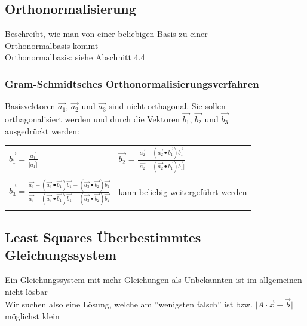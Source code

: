 		 
			
			\subsection{Orthonormalisierung}
			Beschreibt, wie man von einer beliebigen Basis zu einer \\			
			Orthonormalbasis kommt \\		
			Orthonormalbasis: siehe Abschnitt 4.4 \\
			
			
			\subsubsection{Gram-Schmidtsches Orthonormalisierungsverfahren}
			Basisvektoren $\vec{a_1}$, $\vec{a_2}$ und $\vec{a_3}$ sind nicht orthagonal. Sie sollen \\
			orthagonalisiert werden und durch die Vektoren $\vec{b_1}$, $\vec{b_2}$ und $\vec{b_3}$ \\
			ausgedrückt werden: \\
			
			\begin{tabular}{ll}
			$\vec{b_1}$ = $\frac{\vec{a_1}}{\vert \vec{a_1} \vert}$ & $\vec{b_2}$  = $\frac{\vec{a_2} - ( \vec{a_2} \bullet \vec{b_1} ) \vec{b_1}}{\vert \vec{a_2} - ( \vec{a_2} \bullet \vec{b_1} ) \vec{b_1} \vert}$\\
		 \\
			$\vec{b_3}$ = $\frac{\vec{a_3} - ( \vec{a_3} \bullet \vec{b_1} ) \vec{b_1} - ( \vec{a_3} \bullet \vec{b_2} ) \vec{b_2}}  {\vec{a_3} - ( \vec{a_3} \bullet \vec{b_1} ) \vec{b_1} - ( \vec{a_3} \bullet \vec{b_2} ) \vec{b_2}}$  &  kann beliebig weitergeführt werden \\
			\\
			\end{tabular}
					
					
			\vfill\null
			\columnbreak			
			
			
			\subsection{Least Squares Überbestimmtes Gleichungssystem}
			Ein Gleichungssystem mit mehr Gleichungen als Unbekannten ist im allgemeinen nicht lösbar \\	
			Wir suchen also eine Lösung, welche am ''wenigsten falsch'' ist bzw. $\vert A \cdot \vec{x} - \vec{b} \vert$ möglichst klein 
				
